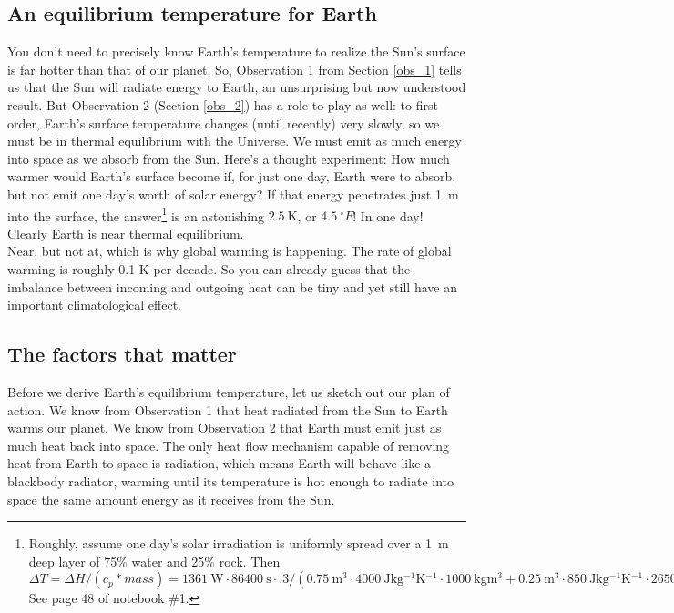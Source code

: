 \documentclass[amstex,12pt]{book}
\begin{document}
\subsection{An equilibrium temperature for Earth}
You don't need to precisely know Earth’s temperature to realize the Sun's surface is far hotter than that of our planet. So, Observation 1 from Section \ref{obs_1} tells us that the Sun will radiate energy to Earth, an unsurprising but now understood result. But Observation 2 (Section \ref{obs_2}) has a role to play as well: to first order, Earth's surface temperature changes (until recently) very slowly, so we must be in thermal equilibrium with the Universe. We must emit as much energy into space as we absorb from the Sun. Here's a thought experiment: How much warmer would Earth’s surface become if, for just one day, Earth were to absorb, but not emit one day's worth of solar energy? If that energy penetrates just \SI{1}{\metre} into the surface, the answer\footnote{Roughly, assume one day's solar irradiation is uniformly spread over a \SI{1}{\metre} deep layer of 75\% water and 25\% rock. Then  
	$\Delta T=\Delta H/(c_p*mass)=\SI{1361}{\watt}\cdot \SI{86400}{\second}\cdot .3/(\SI{0.75}{\metre^3}\cdot\SI{4000}{\joule\kilo\gram^{-1}\kelvin^{-1}}\cdot \SI{1000}{\kilo\gram\metre^3} + \SI{0.25}{\metre^3}\cdot\SI{850}{\joule\kilo\gram^{-1}\kelvin^{-1}}\cdot \SI{2650}{\kilo\gram\metre^3})=2.5 K$
See page 48 of notebook \#1.} is an astonishing $\SI{2.5}{\kelvin}$, or $4.5\ ^{\circ}F$! In one day! Clearly Earth is near thermal equilibrium.\\

Near, but not at, which is why global warming is happening. The rate of global warming is roughly 0.1 K per decade. So you can already guess that the imbalance between incoming and outgoing heat can be tiny and yet still have an important climatological effect.

\subsection{The factors that matter}
Before we derive Earth's equilibrium temperature, let us sketch out our plan of action. We know from Observation 1 that heat radiated from the Sun to Earth warms our planet. We know from Observation 2 that Earth must emit just as much heat back into space. The only heat flow mechanism capable of removing heat from Earth to space is radiation, which means Earth will behave like a blackbody radiator, warming until its temperature is hot enough to radiate into space the same amount energy as it receives from the Sun. 
\end{document}
